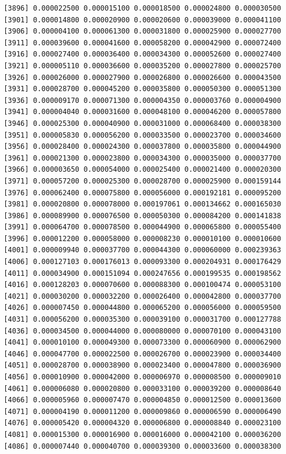 \documentclass[]{article}
\begin{document}
\begin{verbatim}
 [3896] 0.000022500 0.000015100 0.000018500 0.000024800 0.000030500
 [3901] 0.000014800 0.000020900 0.000020600 0.000039000 0.000041100
 [3906] 0.000004100 0.000061300 0.000031800 0.000025900 0.000027700
 [3911] 0.000039600 0.000041600 0.000058200 0.000042900 0.000072400
 [3916] 0.000027400 0.000036400 0.000034300 0.000052600 0.000027400
 [3921] 0.000005110 0.000036600 0.000035200 0.000027800 0.000025700
 [3926] 0.000026000 0.000027900 0.000026800 0.000026600 0.000043500
 [3931] 0.000028700 0.000045200 0.000035800 0.000050300 0.000051300
 [3936] 0.000009170 0.000071300 0.000004350 0.000003760 0.000004900
 [3941] 0.000004040 0.000031600 0.000048100 0.000046200 0.000057800
 [3946] 0.000025300 0.000040900 0.000031000 0.000068400 0.000038300
 [3951] 0.000005830 0.000056200 0.000033500 0.000023700 0.000034600
 [3956] 0.000028400 0.000024300 0.000037800 0.000035800 0.000044900
 [3961] 0.000021300 0.000023800 0.000034300 0.000035000 0.000037700
 [3966] 0.000003650 0.000054000 0.000025400 0.000021400 0.000020300
 [3971] 0.000057200 0.000025300 0.000028700 0.000025900 0.000159144
 [3976] 0.000062400 0.000075800 0.000056000 0.000192181 0.000095200
 [3981] 0.000020800 0.000078000 0.000197061 0.000134662 0.000165030
 [3986] 0.000089900 0.000076500 0.000050300 0.000084200 0.000141838
 [3991] 0.000064700 0.000078500 0.000044900 0.000065800 0.000055400
 [3996] 0.000012200 0.000058000 0.000008230 0.000010100 0.000010600
 [4001] 0.000009940 0.000037700 0.000044300 0.000060000 0.000239363
 [4006] 0.000127103 0.000176013 0.000093300 0.000204931 0.000176429
 [4011] 0.000034900 0.000151094 0.000247656 0.000199535 0.000198562
 [4016] 0.000128203 0.000070600 0.000088300 0.000100474 0.000053100
 [4021] 0.000030200 0.000032200 0.000026400 0.000042800 0.000037700
 [4026] 0.000007450 0.000044800 0.000065200 0.000056000 0.000059500
 [4031] 0.000056200 0.000035300 0.000039100 0.000031700 0.000127788
 [4036] 0.000034500 0.000044000 0.000080000 0.000070100 0.000043100
 [4041] 0.000010100 0.000049300 0.000073300 0.000060900 0.000062900
 [4046] 0.000047700 0.000022500 0.000026700 0.000023900 0.000034400
 [4051] 0.000028700 0.000038900 0.000023400 0.000047800 0.000036900
 [4056] 0.000010900 0.000042000 0.000006970 0.000008500 0.000009010
 [4061] 0.000006080 0.000020800 0.000033100 0.000039200 0.000008640
 [4066] 0.000005960 0.000007470 0.000004850 0.000012500 0.000013600
 [4071] 0.000004190 0.000011200 0.000009860 0.000006590 0.000006490
 [4076] 0.000005420 0.000004320 0.000006800 0.000008840 0.000023100
 [4081] 0.000015300 0.000016900 0.000016000 0.000042100 0.000036200
 [4086] 0.000007440 0.000040700 0.000039300 0.000033600 0.000038300

\end{verbatim}
\end{document}
